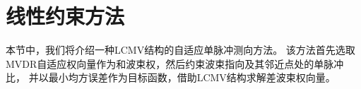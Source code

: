 \documentclass[master]{thesis-uestc}
\begin{document}


\section{线性约束方法}
本节中，我们将介绍一种LCMV结构的自适应单脉冲测向方法。
该方法首先选取MVDR自适应权向量作为和波束权，然后约束波束指向及其邻近点处的单脉冲比，
并以最小均方误差作为目标函数，借助LCMV结构求解差波束权向量。
\end{document}
